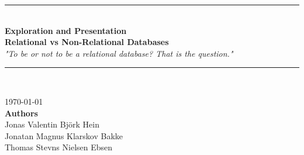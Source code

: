 \linespread{1}
\begin{center}
    \noindent\rule{15cm}{1pt}\\
    \Huge
    \linespread{1.5}
    \textbf{Exploration and Presentation}\\
    \Large
    \textbf{Relational vs Non-Relational Databases}\\
    \small
    \emph{"To be or not to be a relational database? That is the question."}
    \noindent\rule{15cm}{1pt}\\
    \vspace*{0.5cm}
\end{center}

\begin{center}
    \today\\
    \vspace*{0.5cm}
    \textbf{Authors}\\
    Jonas Valentin Björk Hein\\
    Jonatan Magnus Klarskov Bakke\\
    Thomas Stevns Nielsen Ebsen\\    
\end{center}




\vspace{0.5cm}
\linespread{1}
\normalsize